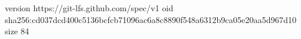 version https://git-lfs.github.com/spec/v1
oid sha256:cd037dcd400c5136bcfcb71096ac6a8c8890f548a6312b9ca05e20aa5d967d10
size 84
